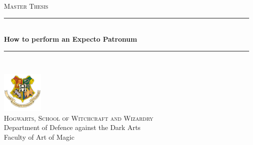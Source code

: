 \begin{titlepage}

    \newcommand{\HRule}{\rule{\linewidth}{0.1mm}} %

    \center %
	
   \textsc{\Large Master Thesis}\\[0.5cm] %
	    
    
    \HRule \\[0.4cm]
    { \huge \bfseries How to perform an Expecto Patronum }\\[0.7cm] %
    \HRule \\[0.4cm]
    
    \vspace{2cm}

    
    \includegraphics[width=0.15\textwidth]{img/hogwarts.png}\\[1cm] %
    
   \textsc{\LARGE Hogwarts, School of Witchcraft and Wizardry}\\[0.5cm] %
   
    \large
    Department of Defence against the Dark Arts \\
    Faculty of Art of Magic \\
   
	\vspace{3cm}
	
    

\end{titlepage}
